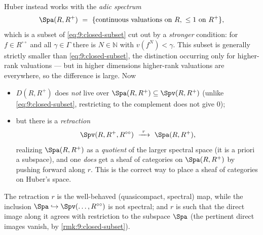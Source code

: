 \begin{remark}
\label{rmk:9:huber-spa}
Huber \cite{Huber_1994} instead works with the \emph{adic spectrum}
\begin{equation*}
\Spa(R,R^{+})\ =\ \{\text{continuous valuations on }R,\ \le 1\text{ on }R^{+}\},
\end{equation*}
which is a subset of \eqref{eq:9:closed-subset} cut out by a \emph{stronger}
condition: for $f\in R^{\circ\circ}$ and all $\gamma\in\Gamma$ there is
$N\in\mathbb N$ with $v(f^{N})<\gamma$. This subset is generally strictly smaller
than \eqref{eq:9:closed-subset}, the distinction occurring only for higher-rank
valuations --- but in higher dimensions higher-rank valuations are everywhere,
so the difference is large. Now
\begin{itemize}
\item $D(R,R^{+})$ does \emph{not} live over $\Spa(R,R^{+})\subseteq
\Spv(R,R^{+})$ (unlike \eqref{eq:9:closed-subset}, restricting to the complement
does not give $0$);
\item but there is a \emph{retraction}
\begin{equation*}
\Spv(R,R^{+},R^{\circ\circ})\ \xrightarrow{\ r\ }\ \Spa(R,R^{+}),
\end{equation*}
realizing $\Spa(R,R^{+})$ as a \emph{quotient} of the larger spectral space (it
is a priori a subspace), and one \emph{does} get a sheaf of categories on
$\Spa(R,R^{+})$ by pushing forward along $r$. This is the correct way to place a
sheaf of categories on Huber's space.
\end{itemize}
The retraction $r$ is the well-behaved (quasicompact, spectral) map, while the
inclusion $\Spa\hookrightarrow\Spv(\dots,R^{\circ\circ})$ is not spectral; and
$r$ is such that the direct image along it agrees with restriction to the
subspace $\Spa$ (the pertinent direct images vanish, by
\cref{rmk:9:closed-subset}).
\end{remark}

